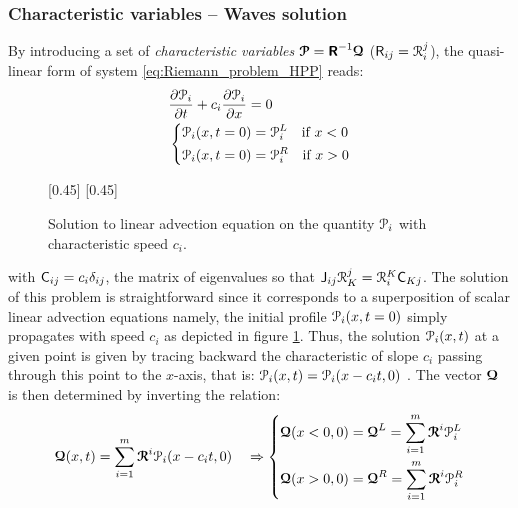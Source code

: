 \subsubsection*{Characteristic variables -- Waves solution}
By introducing a set of \textit{characteristic variables} ${\boldsymbol{\mathcal{P}}}=\boldsymbol{\mathsf{R}}^{-1}{\boldsymbol{\mathcal{Q}}}$ ($\mathsf{R}_{ij}=\mathcal{R}^j_i$), the quasi-linear form of system \eqref{eq:Riemann_problem_HPP} reads:
\begin{equation}
  \label{eq:RP_characteristic_variables}
  \begin{aligned}
    &\frac{\partial \mathcal{P}_i}{\partial t} + c_i\frac{\partial \mathcal{P}_i}{\partial x} = 0 \\
    &\left\lbrace 
      \begin{aligned}
        & \mathcal{P}_i(x,t=0) = \mathcal{P}_i^L \quad \text{if } x< 0\\
        & \mathcal{P}_i(x,t=0) = \mathcal{P}_i^R \quad \text{if } x> 0
      \end{aligned}
    \right.
  \end{aligned}
\end{equation}
\begin{figure}[h!]
  \centering
  \subcaptionbox*{}[0.45\linewidth]{}
  \subcaptionbox*{}[0.45\linewidth]{}
  \caption{Solution to linear advection equation on the quantity $\mathcal{P}_i$ with characteristic speed $c_i$.}
  \label{fig:advection}
\end{figure}
with $\mathsf{C}_{ij}=c_i\delta_{ij}$, the matrix of eigenvalues so that $\mathsf{J}_{ij} \mathcal{R}^j_K = \mathcal{R}^K_i\mathsf{C}_{Kj}$. The solution of this problem is straightforward since it corresponds to a superposition of scalar linear advection equations namely, the initial profile $\mathcal{P}_i(x,t=0)$ simply propagates with speed $c_i$ as depicted in figure \ref{fig:advection}. Thus, the solution  $\mathcal{P}_i(x,t)$ at a given point is given by tracing backward the characteristic of slope $c_i$ passing through this point to the $x$-axis, that is: $\mathcal{P}_i(x,t)=\mathcal{P}_i(x-c_it,0)$  \cite[p.52]{Toro}. 
The vector ${\boldsymbol{\mathcal{Q}}}$ is then determined by inverting the relation:
\begin{equation}
  \label{eq:Q_expansion}
  {\boldsymbol{\mathcal{Q}}}(x,t) = \sum_{i=1}^m {\boldsymbol{\mathcal{R}}}^i \mathcal{P}_i(x-c_it,0) \quad \Rightarrow
  \left\lbrace
    \begin{aligned}
      & {\boldsymbol{\mathcal{Q}}}(x<0,0)={\boldsymbol{\mathcal{Q}}}^L=\sum_{i=1}^{m}{\boldsymbol{\mathcal{R}}}^i \mathcal{P}_i^L\\
      & {\boldsymbol{\mathcal{Q}}}(x>0,0)={\boldsymbol{\mathcal{Q}}}^R= \sum_{i=1}^{m}{\boldsymbol{\mathcal{R}}}^i \mathcal{P}_i^R
    \end{aligned}
    \right.
\end{equation}
